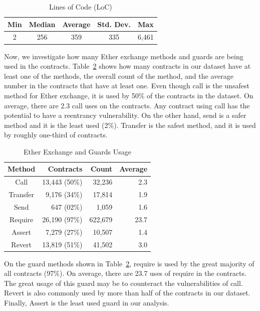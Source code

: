 \documentclass[10pt,conference]{IEEEtran}
\begin{document}
\begin{table}
\center
  \caption{Lines of Code (LoC)}
  \label{tab:loc}
  \begin{tabular}{c c c c c}
    \hline
    Min & Median & Average & Std. Dev. & Max \\
    \hline
   2 & 256 & 359 & 335 & 6,461 \\
  \hline
\end{tabular}
\end{table}

Now, we investigate how many Ether exchange methods and guards are being used in the contracts. Table~\ref{tab:results-all} shows how many contracts in our dataset have at least one of the methods, the overall count of the method, and the average number in the contracts that have at least one. Even though call is the unsafest method for Ether exchange, it is used by 50\% of the contracts in the dataset. On average, there are 2.3 call uses on the contracts. Any contract using call has the potential to have a reentrancy vulnerability. On the other hand, send is a safer method and it is the least used (2\%). Transfer is the safest method, and it is used by roughly one-third of contracts.

\begin{table}
\center
  \caption{Ether Exchange and Guards Usage}
  \label{tab:results-all}
  \begin{tabular}{crrr}
    \hline
    Method & Contracts & Count & Average \\
    \hline
    Call & 13,443 (50\%) & 32,236 & 2.3 \\
    Transfer & 9,176 (34\%) & 17,814 & 1.9 \\
    Send & 647 (02\%) & 1,059& 1.6 \\
    Require & 26,190 (97\%) & 622,679 & 23.7 \\
    Assert & 7,279 (27\%) & 10,507 & 1.4 \\
    Revert & 13,819 (51\%) & 41,502 & 3.0\\
    \hline
\end{tabular}
\end{table}

On the guard methods shown in Table~\ref{tab:results-all}, require is used by the great majority of all contracts (97\%). On average, there are 23.7 uses of require in the contracts. The great usage of this guard may be to counteract the vulnerabilities of call. Revert is also commonly used by more than half of the contracts in our dataset. Finally, Assert is the least used guard in our analysis.
\end{document}
